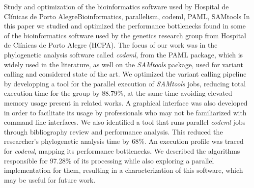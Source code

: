 \documentclass[cic,tc]{iiufrgs}
\begin{document}
\begin{englishabstract}{Study and optimization of the bioinformatics software used by Hospital de Clínicas de Porto Alegre}{Bioinformatics, parallelism, codeml, PAML, SAMtools}
In this paper we studied and optimized the performance bottlenecks found in
some of the bioinformatics software used by the genetics research group from
Hospital de Clínicas de Porto Alegre (HCPA). The focus of our work was in the
phylogenetic analysis software called \textit{codeml}, from the PAML package, which is
widely used in the literature, as well on the \textit{SAMtools} package, used for
variant calling and considered state of the art.
%
We optimized the variant calling pipeline by developping a tool for the
parallel execution of \textit{SAMtools} jobs, reducing total execution time
for the group by 88.79\%, at the same time avoiding elevated memory usage
present in related works. A graphical interface was also developed in order
to facilitate its usage by professionals who may not be
familiarized with command line interfaces.
%
We also identified a tool that runs parallel \textit{codeml} jobs through bibliography
review and performance analysis. This reduced the researcher's phylogenetic
analysis time by 68\%. An execution profile was traced for \textit{codeml}, mapping its
performance bottlenecks. We described the algorithms responsible for 97.28\% of
its processing while also exploring a parallel implementation for them,
resulting in a characterization of this software, which may be useful for
future work.
\end{englishabstract}

\listoffigures

\listoftables
\end{document}
